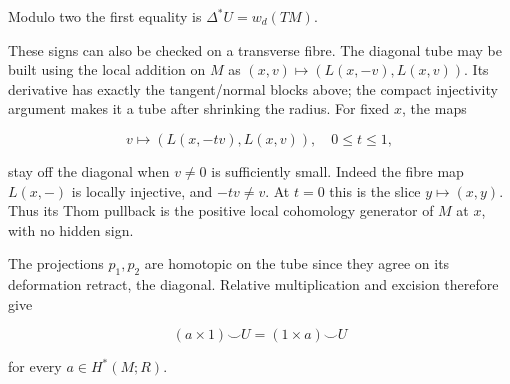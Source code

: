 Modulo two the first equality is \(\Delta^*U=w_d(TM)\).

These signs can also be checked on a transverse fibre. The diagonal tube may be built using the local addition on \(M\) as
\((x,v)\mapsto(L(x,-v),L(x,v))\). Its derivative has exactly the tangent/normal blocks above; the compact injectivity argument makes it a tube after shrinking the radius. For fixed \(x\), the maps

\[
v\longmapsto(L(x,-tv),L(x,v)),\quad 0\leq t\leq1,
\]

stay off the diagonal when \(v\ne0\) is sufficiently small. Indeed the fibre map \(L(x,-)\) is locally injective, and \(-tv\ne v\). At \(t=0\) this is the slice \(y\mapsto(x,y)\). Thus its Thom pullback is the positive local cohomology generator of \(M\) at \(x\), with no hidden sign.

The projections \(p_1,p_2\) are homotopic on the tube since they agree on its deformation retract, the diagonal. Relative multiplication and excision therefore give

\begin{equation}
(a\times1)\smile U=(1\times a)\smile U
\label{courseIII:manifold-duality-the-diagonal-and-wu-classes.source:eq:4.4}
\end{equation}

for every \(a\in H^*(M;R)\).

\label{courseIII:duality:4.1}

